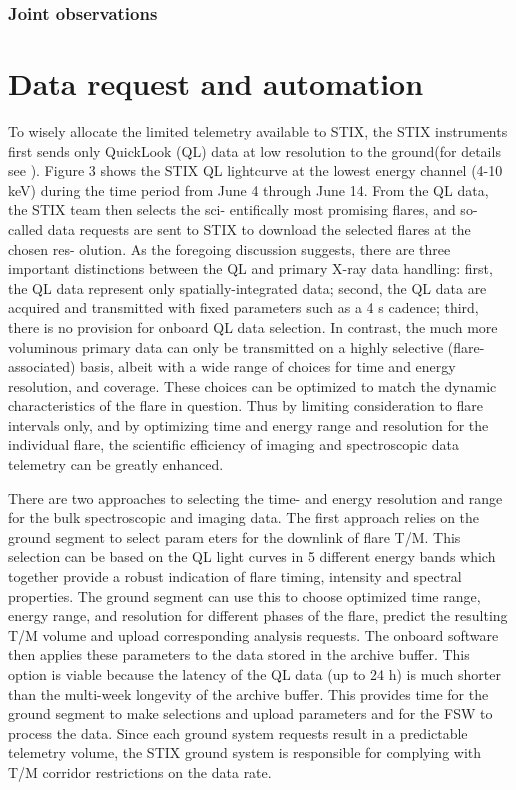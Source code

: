 \documentclass[referee]{aa} %
\begin{document}
\subsubsection{Joint observations}
\section{Data request and automation}
To wisely allocate the limited telemetry available to STIX,
the STIX instruments first sends only QuickLook (QL) data at
low resolution to the ground(for details see \cite{StixInstrument}).
Figure 3 shows the STIX QL lightcurve at the lowest energy
channel (4-10 keV) during the time period from June 4 through
June 14. From the QL data, the STIX team then selects the sci-
entifically most promising flares, and so-called data requests are
sent to STIX to download the selected flares at the chosen res-
olution.
As the foregoing discussion suggests,
 there are three important distinctions between the 
 QL and primary X-ray data handling: first, the QL data represent only 
 spatially-integrated data;  second, the QL data are acquired and 
 transmitted with fixed parameters such as a 4 s cadence; third, there is no 
 provision for onboard QL data selection. 
In contrast, the much more voluminous primary data can only 
be transmitted on a highly selective (flare-associated) basis, albeit with a wide range of choices for time and energy
 resolution, and coverage. These choices can be optimized to match the dynamic characteristics of the flare in question.  
  Thus by limiting consideration to flare intervals only, and by optimizing time and energy range and 
 resolution for the individual flare, the scientific efficiency of imaging and spectroscopic data telemetry can be greatly enhanced.


There are two approaches to selecting the time- and energy
resolution and range for the bulk spectroscopic and imaging data.
The first approach relies on the ground segment to select param
eters for the downlink of flare T/M. This selection can be based
on the QL light curves in 5 different energy bands which together
provide a robust indication of flare timing, intensity and spectral
properties. The ground segment can use this to choose optimized
time range, energy range, and resolution for different phases of
the flare, predict the resulting T/M volume and upload corresponding analysis requests.
The onboard software then applies
these parameters to the data stored in the archive buffer. This
option is viable because the latency of the QL data (up to 24 h)
is much shorter than the multi-week longevity of the archive
buffer. This provides time for the ground segment to make selections 
and upload parameters and for the FSW to process the data.
Since each ground system requests result in a predictable telemetry volume, 
the STIX ground system is responsible for complying with T/M corridor restrictions on the data rate.
\end{document}
